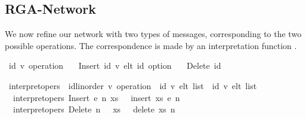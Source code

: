 \documentclass[acmlarge,review,anonymous]{acmart}\settopmatter{printfolios=true}
\begin{document}

\subsection{RGA-Network}
\label{sect.rga.network}

We now refine our network with two types of messages, corresponding to the two
possible operations. The correspondence is made by an interpretation function
.

\begin{isabellebody}
\isanewline
{}\isamarkupfalse%
\ {\isacharparenleft}{\isacharprime}id{\isacharcomma}\ {\isacharprime}v{\isacharparenright}\ operation\ {\isacharequal}\isanewline
\ \ Insert\ {\isachardoublequoteopen}{\isacharparenleft}{\isacharprime}id{\isacharcomma}\ {\isacharprime}v{\isacharparenright}\ elt{\isachardoublequoteclose}\ {\isachardoublequoteopen}{\isacharprime}id\ option{\isachardoublequoteclose}\ {\isacharbar}\isanewline
\ \ Delete\ {\isachardoublequoteopen}{\isacharprime}id{\isachardoublequoteclose}\isanewline
\end{isabellebody}

\begin{isabellebody}
\isamarkupfalse%
\ interpret{\isacharunderscore}opers\ {\isacharcolon}{\isacharcolon}\ {\isachardoublequoteopen}{\isacharparenleft}{\isacharprime}id{\isacharcolon}{\isacharcolon}linorder{\isacharcomma}\ {\isacharprime}v{\isacharparenright}\ operation\ {\isasymRightarrow}\ {\isacharparenleft}{\isacharprime}id{\isacharcomma}\ {\isacharprime}v{\isacharparenright}\ elt\ list\ {\isasymrightharpoonup}\ {\isacharparenleft}{\isacharprime}id{\isacharcomma}\ {\isacharprime}v{\isacharparenright}\ elt\ list{\isachardoublequoteclose}\ {\isacharparenleft}{\isachardoublequoteopen}{\isasymlangle}{\isacharunderscore}{\isasymrangle}{\isachardoublequoteclose}\ {\isacharbrackleft}{}{\isacharbrackright}\ {}{}{}{}{\isacharparenright}\ \isanewline
\ \ {\isachardoublequoteopen}interpret{\isacharunderscore}opers\ {\isacharparenleft}Insert\ e\ n{\isacharparenright}\ xs\ \ {\isacharequal}\ insert\ xs\ e\ n{\isachardoublequoteclose}\ {\isacharbar}\isanewline
\ \ {\isachardoublequoteopen}interpret{\isacharunderscore}opers\ {\isacharparenleft}Delete\ n{\isacharparenright}\ \ \ xs\ \ {\isacharequal}\ delete\ xs\ n{\isachardoublequoteclose}\isanewline
\end{isabellebody}
\end{document}
